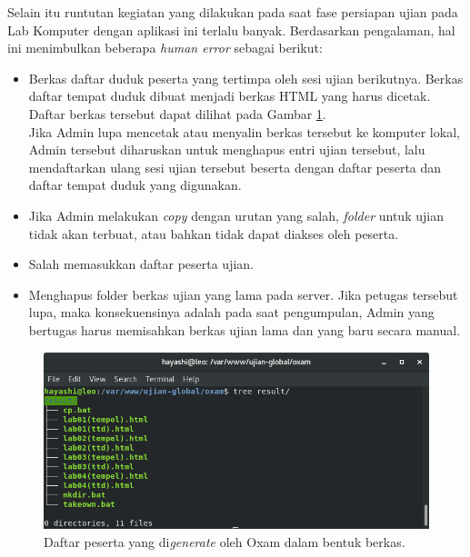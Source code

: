 Selain itu runtutan kegiatan yang dilakukan pada saat fase persiapan ujian pada
Lab Komputer dengan aplikasi ini terlalu banyak. Berdasarkan pengalaman,
hal ini menimbulkan beberapa \textit{human error} sebagai berikut:
    \begin{itemize}
        \item Berkas daftar duduk peserta yang tertimpa oleh sesi ujian
            berikutnya. Berkas daftar tempat duduk dibuat menjadi berkas HTML
            yang harus dicetak. Daftar berkas tersebut dapat dilihat pada Gambar
            \ref{fig:ss-folder-gen}.\\
            Jika Admin lupa mencetak atau menyalin berkas tersebut ke komputer
            lokal, Admin tersebut diharuskan untuk menghapus entri ujian
            tersebut, lalu mendaftarkan ulang sesi ujian tersebut beserta dengan
            daftar peserta dan daftar tempat duduk yang digunakan.

        \item Jika Admin melakukan \textit{copy} dengan urutan yang salah, \textit{folder} untuk
            ujian tidak akan terbuat, atau bahkan tidak dapat diakses oleh peserta.
        
        \item Salah memasukkan daftar peserta ujian.
        
        \item Menghapus folder berkas ujian yang lama pada server. Jika petugas
            tersebut lupa, maka konsekuensinya adalah pada saat pengumpulan,
            Admin yang bertugas harus memisahkan berkas ujian lama dan yang baru
            secara manual.
    \end{itemize}

\begin{figure}
    \centering
    \includegraphics[width=0.7\paperwidth]{Gambar/ss-struktur-folder-generator.png}
    \caption{Daftar peserta yang di\textit{generate} oleh Oxam dalam bentuk
    berkas.}
    \label{fig:ss-folder-gen}
\end{figure}

